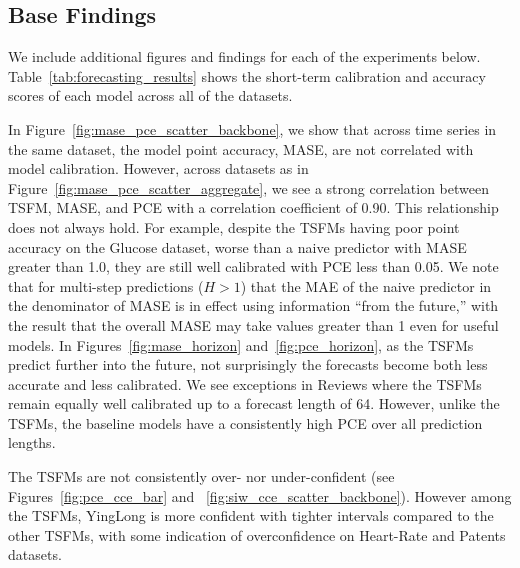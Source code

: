 \documentclass{article}
\begin{document}
\subsection{Base Findings}\label{sec:appendix:findings}

We include additional figures and findings for each of the experiments below. 
Table~\ref{tab:forecasting_results} shows the short-term calibration and accuracy scores of each model across all of the datasets.

In Figure~\ref{fig:mase_pce_scatter_backbone}, we show that across time series in the same dataset, the model point accuracy, MASE, are not correlated with model calibration.
However, across datasets as in Figure~\ref{fig:mase_pce_scatter_aggregate}, we see a strong correlation between TSFM, MASE, and PCE with a correlation coefficient of 0.90.
This relationship does not always hold. 
For example, despite the TSFMs having poor point accuracy on the Glucose dataset, worse than a naive predictor with MASE greater than 1.0, they are still well calibrated with PCE less than 0.05.
We note that for multi-step predictions ($H > 1$) that the MAE of the naive predictor in the denominator of MASE is in effect using information “from the future,” with the result that the overall MASE may take values greater than 1 even for useful models.
In Figures~\ref{fig:mase_horizon} and~\ref{fig:pce_horizon}, as the TSFMs predict further into the future, not surprisingly the forecasts become both less accurate and less calibrated.
We see exceptions in Reviews where the TSFMs remain equally well calibrated up to a forecast length of 64.
However, unlike the TSFMs, the baseline models have a consistently high PCE over all prediction lengths.

The TSFMs are not consistently over- nor under-confident (see Figures~\ref{fig:pce_cce_bar} and ~\ref{fig:siw_cce_scatter_backbone}).
However among the TSFMs, YingLong is more confident with tighter intervals compared to the other TSFMs, with some indication of overconfidence on Heart-Rate and Patents datasets.
\end{document}
